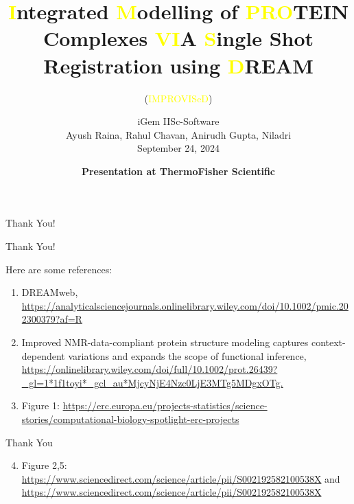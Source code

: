 \documentclass{beamer}
\date{\textcolor{mycolor}{\textbf{Presentation at ThermoFisher Scientific}}}
\author{iGem IISc-Software \\ Ayush Raina, Rahul Chavan, Anirudh Gupta, Niladri \\ September 24, 2024}
\title{\textcolor{yellow}{I}ntegrated \textcolor{yellow}{M}odelling of \textcolor{yellow}{PRO}TEIN Complexes \textcolor{yellow}{VI}A \textcolor{yellow}{S}ingle Shot Registration using \textcolor{yellow}{D}REAM}
\subtitle{(\textcolor{yellow}{IMPROVISeD})}
\begin{document}
\begin{frame}
    \titlepage
\end{frame}







\begin{frame}{Thank You!}
    \begin{center}
        \Huge Thank You!
    \end{center}
    Here are some references:
    \begin{enumerate}
        \item DREAMweb, \url{https://analyticalsciencejournals.onlinelibrary.wiley.com/doi/10.1002/pmic.202300379?af=R}
        \item Improved NMR-data-compliant protein structure modeling captures context-dependent variations and expands the scope of functional inference, \url{https://onlinelibrary.wiley.com/doi/full/10.1002/prot.26439?_gl=1*1f1toyi*_gcl_au*MjcyNjE4Nzc0LjE3MTg5MDgxOTg.}
        \item Figure 1: \url{https://erc.europa.eu/projects-statistics/science-stories/computational-biology-spotlight-erc-projects}
    \end{enumerate}
\end{frame}

\begin{frame}{Thank You}

    \begin{enumerate}
        \setcounter{enumi}{3}
        \item Figure 2,5: \url{https://www.sciencedirect.com/science/article/pii/S002192582100538X} and \url{https://www.sciencedirect.com/science/article/pii/S002192582100538X}
    \end{enumerate}

\end{frame}
\end{document}
